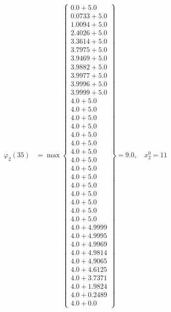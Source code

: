 \documentclass{article}
\begin{document}
\begin{align*}
  
\varphi_{2}(35) &= \max \left\{ \begin{array}{c}
0.0 + 5.0 \\
 0.0733 + 5.0 \\
 1.0094 + 5.0 \\
 2.4026 + 5.0 \\
 3.3614 + 5.0 \\
 3.7975 + 5.0 \\
 3.9469 + 5.0 \\
 3.9882 + 5.0 \\
 3.9977 + 5.0 \\
 3.9996 + 5.0 \\
 3.9999 + 5.0 \\
 4.0 + 5.0 \\
 4.0 + 5.0 \\
 4.0 + 5.0 \\
 4.0 + 5.0 \\
 4.0 + 5.0 \\
 4.0 + 5.0 \\
 4.0 + 5.0 \\
 4.0 + 5.0 \\
 4.0 + 5.0 \\
 4.0 + 5.0 \\
 4.0 + 5.0 \\
 4.0 + 5.0 \\
 4.0 + 5.0 \\
 4.0 + 5.0 \\
 4.0 + 5.0 \\
 4.0 + 4.9999 \\
 4.0 + 4.9995 \\
 4.0 + 4.9969 \\
 4.0 + 4.9814 \\
 4.0 + 4.9065 \\
 4.0 + 4.6125 \\
 4.0 + 3.7371 \\
 4.0 + 1.9824 \\
 4.0 + 0.2489 \\
 4.0 + 0.0
\end{array} \right\}=9.0,\quad x_{2}^0=11\\
  
  
  

\end{align*}
\end{document}
